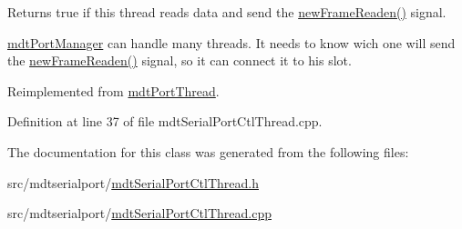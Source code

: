 Returns true if this thread reads data and send the \hyperlink{classmdt_port_thread_a7fc2245c753fd65e1beffec211c41461}{new\-Frame\-Readen()} signal. 

\hyperlink{classmdt_port_manager}{mdt\-Port\-Manager} can handle many threads. It needs to know wich one will send the \hyperlink{classmdt_port_thread_a7fc2245c753fd65e1beffec211c41461}{new\-Frame\-Readen()} signal, so it can connect it to his slot. 

Reimplemented from \hyperlink{classmdt_port_thread_acdb3d96287c571cc08ef39860dc324b1}{mdt\-Port\-Thread}.



Definition at line 37 of file mdt\-Serial\-Port\-Ctl\-Thread.\-cpp.



The documentation for this class was generated from the following files\-:\begin{DoxyCompactItemize}
\item 
src/mdtserialport/\hyperlink{mdt_serial_port_ctl_thread_8h}{mdt\-Serial\-Port\-Ctl\-Thread.\-h}\item 
src/mdtserialport/\hyperlink{mdt_serial_port_ctl_thread_8cpp}{mdt\-Serial\-Port\-Ctl\-Thread.\-cpp}\end{DoxyCompactItemize}
